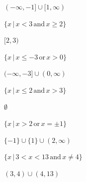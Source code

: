 \documentclass{ximera}
\begin{document}
\begin{question}
\begin{problem}
\begin{solution}
    $(-\infty, -1] \cup [1, \infty)$
\end{solution}
\end{problem}

\begin{problem}
$\{x\,|\, x < 3 \, \text{and} \, x \geq 2 \}$

\begin{solution}
    $[2, 3)$
\end{solution}
\end{problem}

\begin{problem}
$\{x\,|\, x \leq -3 \, \text{or} \, x > 0 \}$

\begin{solution}
    $(-\infty, -3] \cup (0, \infty)$
\end{solution}
\end{problem}

\begin{problem}
  $\{x\,|\, x \leq 2 \, \text{and} \, x > 3 \}$  

  \begin{solution}
      $\emptyset$
  \end{solution}
\end{problem}

\begin{problem}
$\{x\,|\, x > 2 \, \text{or} \, x = \pm 1 \}$  

\begin{solution}
    $\{-1\} \cup \{1\} \cup (2, \infty)$
\end{solution}
\end{problem}

\begin{problem}\label{writeintervallast}
$\{x\,|\,  3 < x < 13 \, \text{and} \, x \neq 4 \}$

\begin{solution}
     $(3,4) \cup (4, 13)$
\end{solution}
\end{problem}

\end{question}
\end{document}
